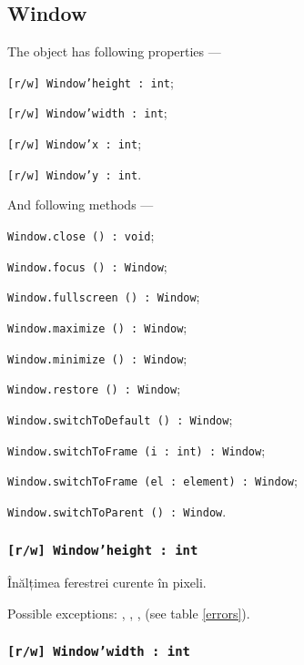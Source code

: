 \subsection{{\color{orange} Window}}

The object \window{} has following properties —
\begin{icItems}
	\item \texttt{[r/w] Window'height : int};
	\item \texttt{[r/w] Window'width : int};
	\item \texttt{[r/w] Window'x : int};
	\item \texttt{[r/w] Window'y : int}.
\end{icItems}

And following methods —
\begin{icItems}
	\item \texttt{Window.close () : void};
	\item \texttt{Window.focus () : Window};
	\item \texttt{Window.fullscreen () : Window};
	\item \texttt{Window.maximize () : Window};
	\item \texttt{Window.minimize () : Window};
	\item \texttt{Window.restore () : Window};
	\item \texttt{Window.switchToDefault () : Window};
	\item \texttt{Window.switchToFrame (i : int) : Window};
	\item \texttt{Window.switchToFrame (el : element) : Window};
	\item \texttt{Window.switchToParent () : Window}.
\end{icItems}

\subsubsection{\texttt{[r/w] Window'height : int}}

Înălțimea ferestrei curente în pixeli.

Possible exceptions: , , ,  (see table \ref{errors}).

\subsubsection{\texttt{[r/w] Window'width : int}}

